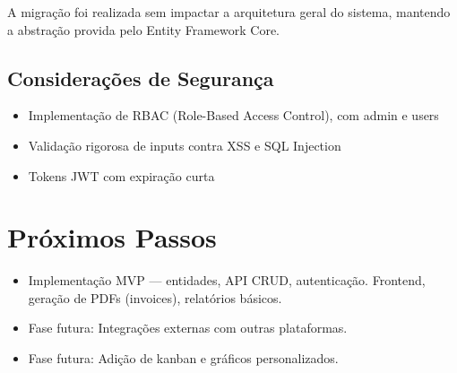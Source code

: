 \documentclass[a4paper,12pt]{article}
\begin{document}
A migração foi realizada sem impactar a arquitetura geral do sistema, mantendo a abstração provida pelo Entity Framework Core.

\subsection{Considerações de Segurança}
\begin{itemize}[nosep]
  \item Implementação de RBAC (Role-Based Access Control), com admin e users
  \item Validação rigorosa de inputs contra XSS e SQL Injection
  \item Tokens JWT com expiração curta
\end{itemize}

\section{Próximos Passos}
\begin{itemize}[nosep]
  \item Implementação MVP — entidades, API CRUD, autenticação. Frontend, geração de PDFs (invoices), relatórios básicos.  
  \item Fase futura: Integrações externas com outras plataformas.
  \item Fase futura: Adição de kanban e gráficos personalizados.
\end{itemize}

\end{document}
